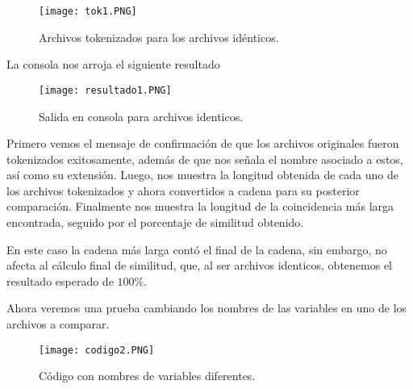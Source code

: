 \documentclass[12pt,twoside]{article}
\begin{document}
\vspace{0cm}

\begin{figure}[htb]
\centering
\texttt{[image: tok1.PNG]}
\caption{Archivos tokenizados para los archivos id\'enticos.}
\end{figure}

\vspace{0cm}

\newpage

La consola nos arroja el siguiente resultado

\vspace{0cm}

\begin{figure}[htb]
\centering
\texttt{[image: resultado1.PNG]}
\caption{Salida en consola para archivos identicos.}
\end{figure}

\vspace{0cm}

Primero vemos el mensaje de confirmaci\'on de que los archivos originales fueron tokenizados exitosamente, adem\'as de que nos señala el nombre asociado a estos, as\'i como su extensi\'on. Luego, nos muestra la longitud obtenida de cada uno de los archivos tokenizados y ahora convertidos a cadena para su posterior comparaci\'on. Finalmente nos muestra la longitud de la coincidencia m\'as larga encontrada, seguido por el porcentaje de similitud obtenido.

\vspace{5mm}

En este caso la cadena m\'as larga cont\'o el final de la cadena, sin embargo, no afecta al c\'alculo final de similitud, que, al ser archivos identicos, obtenemos el resultado esperado de $100\%$. 

\newpage

Ahora veremos una prueba cambiando los nombres de las variables en uno de los archivos a comparar.

\vspace{0cm}

\begin{figure}[htb]
\centering
\texttt{[image: codigo2.PNG]}
\caption{C\'odigo con nombres de variables diferentes.}
\end{figure}

\vspace{0cm}

\vspace{5mm} %
\end{document}
